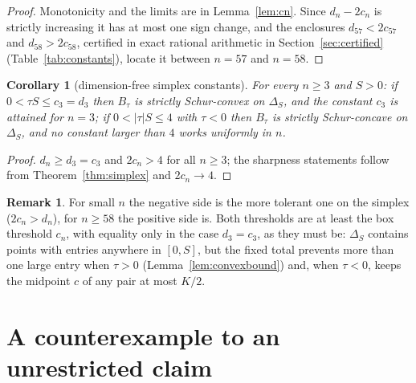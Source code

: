 \documentclass[11pt,a4paper]{article}
\theoremstyle{plain}
\newtheorem{corollary}[theorem]{Corollary}
\theoremstyle{definition}
\newtheorem{remark}[theorem]{Remark}
\newcommand{\Simp}{\Delta}
\begin{document}
\begin{proof}
Monotonicity and the limits are in Lemma~\ref{lem:cn}. Since $d_n-2c_n$ is strictly increasing it has at most one sign change, and the enclosures $d_{57}<2c_{57}$ and $d_{58}>2c_{58}$, certified in exact rational arithmetic in Section~\ref{sec:certified} (Table~\ref{tab:constants}), locate it between $n=57$ and $n=58$.
\end{proof}

\begin{corollary}[dimension-free simplex constants]\label{cor:simplex-dimfree}
For every $n\ge 3$ and $S>0$: if $0<\tau S\le c_3=d_3$ then $B_\tau$ is strictly Schur-convex on $\Simp_S$, and the constant $c_3$ is attained for $n=3$; if $0<|\tau|S\le 4$ with $\tau<0$ then $B_\tau$ is strictly Schur-concave on $\Simp_S$, and no constant larger than $4$ works uniformly in $n$.
\end{corollary}

\begin{proof}
$d_n\ge d_3=c_3$ and $2c_n>4$ for all $n\ge 3$; the sharpness statements follow from Theorem~\ref{thm:simplex} and $2c_n\to 4$.
\end{proof}

\begin{remark}
For small $n$ the negative side is the more tolerant one on the simplex ($2c_n>d_n$), for $n\ge 58$ the positive side is. Both thresholds are at least the box threshold $c_n$, with equality only in the case $d_3=c_3$, as they must be: $\Simp_S$ contains points with entries anywhere in $[0,S]$, but the fixed total prevents more than one large entry when $\tau>0$ (Lemma~\ref{lem:convexbound}) and, when $\tau<0$, keeps the midpoint $c$ of any pair at most $K/2$.
\end{remark}

\section{A counterexample to an unrestricted claim}\label{sec:counterexample}
\end{document}
